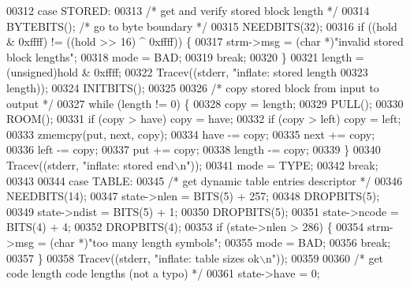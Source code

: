 \begin{DoxyCode}
{{{{{{{00312         \textcolor{keywordflow}{case} STORED:
00313             \textcolor{comment}{/* get and verify stored block length */}
00314             BYTEBITS();                         \textcolor{comment}{/* go to byte boundary */}
00315             NEEDBITS(32);
00316             \textcolor{keywordflow}{if} ((hold & 0xffff) != ((hold >> 16) ^ 0xffff)) \{
00317                 strm->msg = (\textcolor{keywordtype}{char} *)\textcolor{stringliteral}{"invalid stored block lengths"};
00318                 mode = BAD;
00319                 \textcolor{keywordflow}{break};
00320             \}
00321             length = (unsigned)hold & 0xffff;
00322             Tracev((stderr, \textcolor{stringliteral}{"inflate:       stored length %
00323                     length));
00324             INITBITS();
00325 
00326             \textcolor{comment}{/* copy stored block from input to output */}
00327             \textcolor{keywordflow}{while} (length != 0) \{
00328                 copy = length;
00329                 PULL();
00330                 ROOM();
00331                 \textcolor{keywordflow}{if} (copy > have) copy = have;
00332                 \textcolor{keywordflow}{if} (copy > left) copy = left;
00333                 zmemcpy(put, next, copy);
00334                 have -= copy;
00335                 next += copy;
00336                 left -= copy;
00337                 put += copy;
00338                 length -= copy;
00339             \}
00340             Tracev((stderr, \textcolor{stringliteral}{"inflate:       stored end\(\backslash\)n"}));
00341             mode = TYPE;
00342             \textcolor{keywordflow}{break};
00343 
00344         \textcolor{keywordflow}{case} TABLE:
00345             \textcolor{comment}{/* get dynamic table entries descriptor */}
00346             NEEDBITS(14);
00347             state->nlen = BITS(5) + 257;
00348             DROPBITS(5);
00349             state->ndist = BITS(5) + 1;
00350             DROPBITS(5);
00351             state->ncode = BITS(4) + 4;
00352             DROPBITS(4);
00353             \textcolor{keywordflow}{if} (state->nlen > 286) \{
00354                 strm->msg = (\textcolor{keywordtype}{char} *)\textcolor{stringliteral}{"too many length symbols"};
00355                 mode = BAD;
00356                 \textcolor{keywordflow}{break};
00357             \}
00358             Tracev((stderr, \textcolor{stringliteral}{"inflate:       table sizes ok\(\backslash\)n"}));
00359 
00360             \textcolor{comment}{/* get code length code lengths (not a typo) */}
00361             state->have = 0;
}}}}}}}}
\end{DoxyCode}
